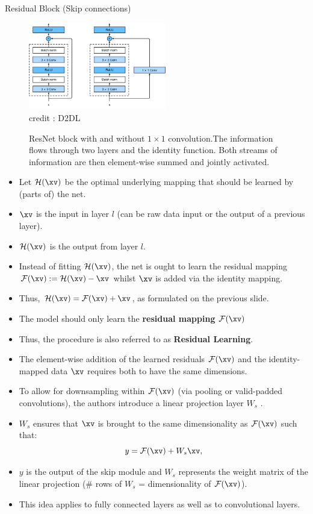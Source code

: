 \begin{vbframe}{Residual Block (Skip connections)}
  \begin{figure}
  \centering
    \includegraphics[width=6cm]{plots/moderncnn/resnet-block.png}
    \tiny{\\ credit : D2DL}
    \caption{ResNet block with and without $1 \times 1$ convolution.The information flows through two layers and the identity function. Both streams of information are then element-wise summed and jointly activated.}
  \end{figure}

\framebreak
    \begin{itemize}
        \item Let $\mathcal{H}(\xv)$ be the optimal underlying mapping that should be learned by (parts of) the net.
        \item $\xv$ is the input in layer $l$ (can be raw data input or the output of a previous layer).
        \item $\mathcal{H}(\xv)$ is the output from layer $l$.
        \item Instead of fitting $\mathcal{H}(\xv)$, the net is ought to learn the residual mapping $\mathcal{F}(\xv):=\mathcal{H}(\xv)-\xv$ whilst $\xv$ is added via the identity mapping.
        \item Thus, $\mathcal{H}(\xv) = \mathcal{F}(\xv) + \xv$, as formulated on the previous slide.
        \item The model should only learn the \textbf{residual mapping} $\mathcal{F}(\xv)$ 
        \item Thus, the procedure is also referred to as \textbf{Residual Learning}.
    \end{itemize}
\framebreak
    \begin{itemize}
        \item The element-wise addition of the learned residuals $\mathcal{F}(\xv)$ and the identity-mapped data $\xv$ requires both to have the same dimensions.
        \item To allow for downsampling within $\mathcal{F}(\xv)$ (via pooling or valid-padded convolutions), the authors introduce a linear projection layer $W_s$ .
        \item $W_s$ ensures that $\xv$ is brought to the same dimensionality as $\mathcal{F}(\xv)$ such that:
        $$
            y = \mathcal{F}(\xv) + W_s\xv,
        $$
        \item $y$ is the output of the skip module and $W_s$ represents the weight matrix of the linear projection (\# rows of $W_s$ = dimensionality of $\mathcal{F}(\xv)$).
        \item This idea applies to fully connected layers as well as to convolutional layers.
    \end{itemize}
\end{vbframe}

